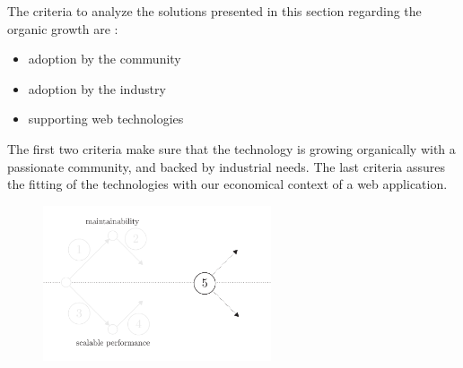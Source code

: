 The criteria to analyze the solutions presented in this section regarding the organic growth are : 
\begin{itemize}
\item adoption by the community
\item adoption by the industry
\item supporting web technologies
\end{itemize}
The first two criteria make sure that the technology is growing organically with a passionate community, and backed by industrial needs.
The last criteria assures the fitting of the technologies with our economical context of a web application. 




\begin{figure}[h!]
\begin{center}
\includegraphics[width=0.6\textwidth]{../ressources/state-of-the-art-5.pdf}
\end{center}
\end{figure}








